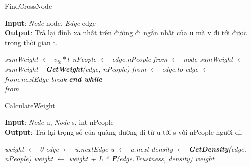 \documentclass{article}
\begin{document}
    \begin{algorithm}
        \caption{FindCrossNode}
        \textbf{Input}: \textit{Node} node, \textit{Edge} edge\\
        \textbf{Output}: Trả lại đỉnh xa nhất trên đường đi ngắn nhất của u mà v 
        đi tới được trong thời gian t.
        \begin{algorithmic}
            \em
            \State sumWeight $\gets$ $v_{tb}*t$ 
            \State nPeople $\gets$ edge.nPeople
            \State from $\gets$ node
            \State sumWeight $\gets$ sumWeight - \textbf{GetWeight}(edge, nPeople)
            \State from $\gets$ edge.to
            \State edge $\gets$ from.nextEdge
             break
            \EndIf
            \EndWhile 
            \textbf{end while} \\
            \Return from
            \EndProcedure
        \end{algorithmic}
    \end{algorithm}

    \begin{algorithm}
        \caption{CalculateWeight}
        \textbf{Input}: \textit{Node} u, \textit{Node} s, int nPeople \\
        \textbf{Output}: Trả lại trọng số của quãng đường đi từ u tới s với 
        nPeople người đi.
        \begin{algorithmic}
            \em
            \State weight $\gets$ 0
            \State edge $\gets$ u.nextEdge
            \State u $\gets$ u.next
            \State density $\gets$ \textbf{GetDensity}(edge, nPeople)
            \State weight $\gets$ weight + L * \textbf{F}(edge.Trustness, density)
            \EndWhile
            \Return weight
            \EndProcedure
        \end{algorithmic}
    \end{algorithm}
\end{document}
